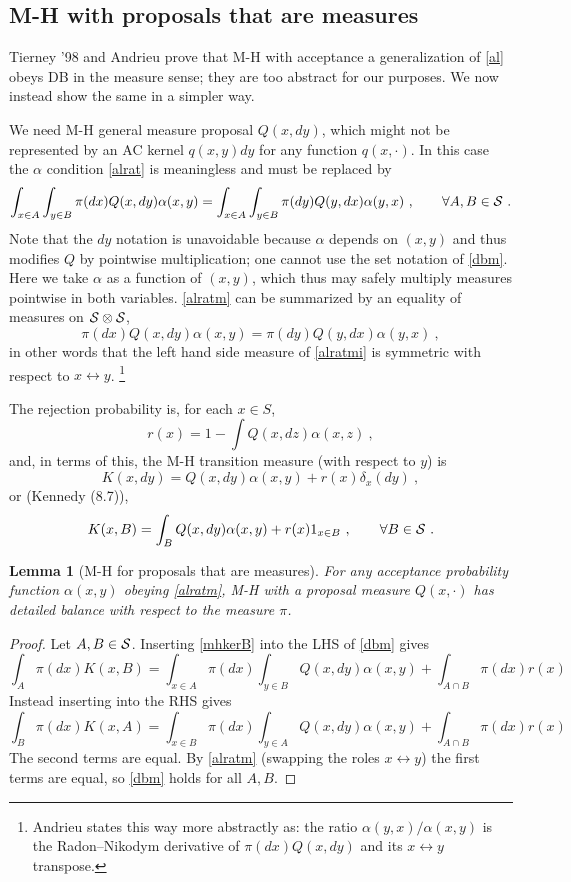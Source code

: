 \documentclass[10pt]{article}
\newcommand{\be}{\begin{equation}}
\newcommand{\ee}{\end{equation}}
\newtheorem{lem}[thm]{Lemma}
\newcommand{\al}{\alpha}
\begin{document}
\subsection{M-H with proposals that are measures}
\label{s:mhmeas}

Tierney '98 and Andrieu prove that M-H with acceptance a generalization of
\eqref{al}
obeys DB in the measure sense; they are too abstract for our purposes.
We now instead show the same in a simpler way.

We need M-H general measure proposal $Q(x,dy)$, which might not
be represented by an AC kernel $q(x,y)dy$ for any function $q(x,\cdot)$.
In this case the $\al$ condition \eqref{alrat} is meaningless and must be replaced by
\be
\int_{x\in A} \int_{y \in B} \pi(dx) Q(x,dy) \al(x,y) = \int_{x\in A} \int_{y\in B} \pi(dy) Q(y,dx) \al(y,x)~, \qquad \forall A,B \in \cal S~.
\label{alratm}
\ee
Note that the $dy$ notation is unavoidable because
$\al$ depends on $(x,y)$ and thus modifies $Q$ by pointwise multiplication;
one cannot use the set notation of \eqref{dbm}.
Here we take $\al$ as a function of $(x,y)$, which thus may safely multiply
measures pointwise in both variables.
\eqref{alratm} can be summarized by an equality of
measures on $\cal S \otimes \cal S$,
\be
\pi(dx) Q(x,dy) \al(x,y) = \pi(dy) Q(y,dx) \al(y,x)~,
\label{alratmi}
\ee
in other words that the left hand side measure of \eqref{alratmi} is symmetric
with respect to $x\leftrightarrow y$.
\footnote{Andrieu states this way more abstractly as: the ratio $\al(y,x)/\al(x,y)$
is the Radon--Nikodym derivative of $\pi(dx) Q(x,dy)$ and its
$x\leftrightarrow y$ transpose.}


The rejection probability is, for each $x\in S$,
\be
r(x) = 1 - \int Q(x,dz) \al(x,z)~,
\label{rejm}
\ee
and, in terms of this, the M-H transition measure (with respect to $y$) is
\be
K(x,dy) = Q(x,dy) \al(x,y) + r(x) \delta_x(dy)~,
\label{mhkerm}
\ee
or (Kennedy (8.7)),
\be
K(x,B) = \int_B Q(x,dy) \al(x,y) + r(x) 1_{x\in B}~, \qquad \forall B \in \cal S
~.
\label{mhkerB}
\ee

\begin{lem}[M-H for proposals that are measures]
  For any acceptance probability function $\al(x,y)$ obeying \eqref{alratm},
  M-H with a proposal measure $Q(x,\cdot)$ has detailed balance with respect to the measure $\pi$.
  \label{l:mh}
\end{lem}
\begin{proof}
  Let $A,B\in \cal S$.
  Inserting \eqref{mhkerB} into the LHS of \eqref{dbm}
  gives
  $$
  \int_A \pi(dx) K(x,B) = \int_{x\in A} \pi(dx) \int_{y\in B} Q(x,dy) \al(x,y)
  + \int_{A\cap B} \pi(dx) r(x)
  $$
  Instead inserting into the RHS gives
  $$
  \int_B \pi(dx) K(x,A) = \int_{x\in B} \pi(dx) \int_{y\in A} Q(x,dy) \al(x,y)
  + \int_{A\cap B} \pi(dx) r(x)
  $$
  The second terms are equal.
  By \eqref{alratm} (swapping the roles $x\leftrightarrow y$) the first terms are equal,
  so \eqref{dbm} holds for all $A,B$.
\end{proof}
\end{document}
